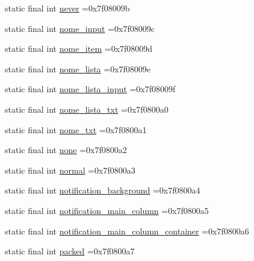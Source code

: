 \begin{DoxyCompactItemize}
\item 
static final int \mbox{\hyperlink{classbr_1_1unb_1_1cic_1_1mp_1_1marketmaster_1_1R_1_1id_a1e1763b01722e1edf3e8eca53095f175}{never}} =0x7f08009b
\item 
static final int \mbox{\hyperlink{classbr_1_1unb_1_1cic_1_1mp_1_1marketmaster_1_1R_1_1id_ad1fb2392d7456b3573f1759d52b12593}{nome\+\_\+input}} =0x7f08009c
\item 
static final int \mbox{\hyperlink{classbr_1_1unb_1_1cic_1_1mp_1_1marketmaster_1_1R_1_1id_a884db1241ff5f0d2d0ad8f1d9b46f29f}{nome\+\_\+item}} =0x7f08009d
\item 
static final int \mbox{\hyperlink{classbr_1_1unb_1_1cic_1_1mp_1_1marketmaster_1_1R_1_1id_ab2996d1f03d5dd401c798ece1b048c84}{nome\+\_\+lista}} =0x7f08009e
\item 
static final int \mbox{\hyperlink{classbr_1_1unb_1_1cic_1_1mp_1_1marketmaster_1_1R_1_1id_aecec9531a785780cc518efb6c0065d5c}{nome\+\_\+lista\+\_\+input}} =0x7f08009f
\item 
static final int \mbox{\hyperlink{classbr_1_1unb_1_1cic_1_1mp_1_1marketmaster_1_1R_1_1id_a3b2c132254c7aecc4734dd3867df2b37}{nome\+\_\+lista\+\_\+txt}} =0x7f0800a0
\item 
static final int \mbox{\hyperlink{classbr_1_1unb_1_1cic_1_1mp_1_1marketmaster_1_1R_1_1id_a282517cc0aeaaec9df8f2a543614a5e2}{nome\+\_\+txt}} =0x7f0800a1
\item 
static final int \mbox{\hyperlink{classbr_1_1unb_1_1cic_1_1mp_1_1marketmaster_1_1R_1_1id_a95eef4969eace37ff2d19c0fe812969c}{none}} =0x7f0800a2
\item 
static final int \mbox{\hyperlink{classbr_1_1unb_1_1cic_1_1mp_1_1marketmaster_1_1R_1_1id_a675af1e45f5ee51acd85b57ab9a818eb}{normal}} =0x7f0800a3
\item 
static final int \mbox{\hyperlink{classbr_1_1unb_1_1cic_1_1mp_1_1marketmaster_1_1R_1_1id_a48a74cdb988db789ac84ec45dc7b93b2}{notification\+\_\+background}} =0x7f0800a4
\item 
static final int \mbox{\hyperlink{classbr_1_1unb_1_1cic_1_1mp_1_1marketmaster_1_1R_1_1id_ab7d13377c4ea46c01b4a82fbc91d778d}{notification\+\_\+main\+\_\+column}} =0x7f0800a5
\item 
static final int \mbox{\hyperlink{classbr_1_1unb_1_1cic_1_1mp_1_1marketmaster_1_1R_1_1id_a17ec6b2c125c05f87d940feb0001044b}{notification\+\_\+main\+\_\+column\+\_\+container}} =0x7f0800a6
\item 
static final int \mbox{\hyperlink{classbr_1_1unb_1_1cic_1_1mp_1_1marketmaster_1_1R_1_1id_acae854c9944b07239dda36a5f77b531d}{packed}} =0x7f0800a7

\end{DoxyCompactItemize}
